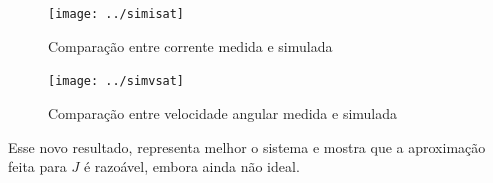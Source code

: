 \documentclass{article}
\begin{document}
\begin{figure}[H]
	\centering
	\texttt{[image: ../simisat]}
	\caption{Comparação entre corrente medida e simulada}
	\label{fig:simisat}
\end{figure}
\begin{figure}[H]
	\centering
	\texttt{[image: ../simvsat]}
	\caption{Comparação entre velocidade angular medida e simulada}
	\label{fig:simvsat}
\end{figure}

Esse novo resultado, representa melhor o sistema e mostra que a aproximação feita para $J$ é razoável, embora ainda não ideal.

\begin{thebibliography}{widestlabel}
\end{thebibliography}
\end{document}
